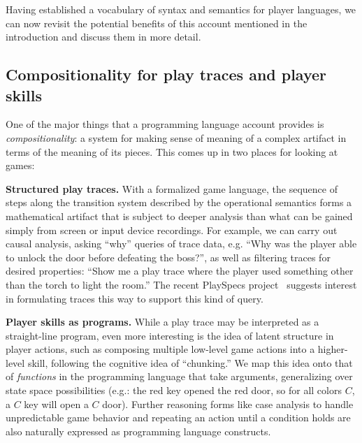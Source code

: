 
Having established a vocabulary of syntax and semantics for player
languages, we can now revisit the potential benefits of this account
mentioned in the introduction and discuss them in more detail.

\subsection{Compositionality for play traces and player skills}

One of the major things that a programming language account provides is
{\em compositionality}: a system for making sense of meaning of a complex
artifact in terms of the meaning of its pieces. This comes up in two places
for looking at games:

{\bf Structured play traces.} With a formalized game language, the sequence
of steps along the transition system described by the operational semantics
forms a mathematical artifact that is subject to deeper analysis than what
can be gained simply from screen or input device recordings. For example,
we can carry out causal analysis, asking ``why'' queries of trace data,
e.g. ``Why was the player able to unlock the door before defeating the boss?'',
as well as filtering traces for desired properties: ``Show me a play trace
where the player used something other than the torch to light the room.''
The recent PlaySpecs project~\cite{osborn2015playspecs} suggests interest
in formulating traces this way to support this kind of query.

{\bf Player skills as programs.} While a play trace may be interpreted as a
straight-line program, even more interesting is the idea of latent
structure in player actions, such as composing multiple low-level game
actions into a higher-level skill, following the cognitive idea of
``chunking.'' We map this idea onto that of {\em functions} in the
programming language that take arguments, generalizing over state space
possibilities (e.g.: the red key opened the red door, so for all colors
$C$, a $C$ key will open a $C$ door). Further reasoning forms like case
analysis to handle unpredictable game behavior and repeating an action
until a condition holds are also naturally expressed as programming
language constructs.


